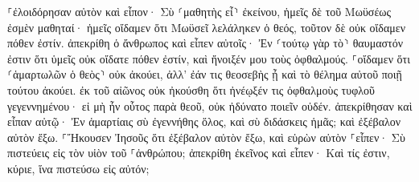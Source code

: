 \documentclass{openreader}
\begin{document}
⸀ἐλοιδόρησαν αὐτὸν καὶ εἶπον· Σὺ ⸂μαθητὴς εἶ⸃ ἐκείνου, ἡμεῖς δὲ τοῦ Μωϋσέως ἐσμὲν μαθηταί· 
ἡμεῖς οἴδαμεν ὅτι Μωϋσεῖ λελάληκεν ὁ θεός, τοῦτον δὲ οὐκ οἴδαμεν πόθεν ἐστίν. 
ἀπεκρίθη ὁ ἄνθρωπος καὶ εἶπεν αὐτοῖς· Ἐν ⸂τούτῳ γὰρ τὸ⸃ θαυμαστόν ἐστιν ὅτι ὑμεῖς οὐκ οἴδατε πόθεν ἐστίν, καὶ ἤνοιξέν μου τοὺς ὀφθαλμούς. 
⸀οἴδαμεν ὅτι ⸂ἁμαρτωλῶν ὁ θεὸς⸃ οὐκ ἀκούει, ἀλλ’ ἐάν τις θεοσεβὴς ᾖ καὶ τὸ θέλημα αὐτοῦ ποιῇ τούτου ἀκούει. 
ἐκ τοῦ αἰῶνος οὐκ ἠκούσθη ὅτι ἠνέῳξέν τις ὀφθαλμοὺς τυφλοῦ γεγεννημένου· 
εἰ μὴ ἦν οὗτος παρὰ θεοῦ, οὐκ ἠδύνατο ποιεῖν οὐδέν. 
ἀπεκρίθησαν καὶ εἶπαν αὐτῷ· Ἐν ἁμαρτίαις σὺ ἐγεννήθης ὅλος, καὶ σὺ διδάσκεις ἡμᾶς; καὶ ἐξέβαλον αὐτὸν ἔξω. 
⸀Ἤκουσεν Ἰησοῦς ὅτι ἐξέβαλον αὐτὸν ἔξω, καὶ εὑρὼν αὐτὸν ⸀εἶπεν· Σὺ πιστεύεις εἰς τὸν υἱὸν τοῦ ⸀ἀνθρώπου; 
ἀπεκρίθη ἐκεῖνος καὶ εἶπεν· Καὶ τίς ἐστιν, κύριε, ἵνα πιστεύσω εἰς αὐτόν; 
\end{document}
